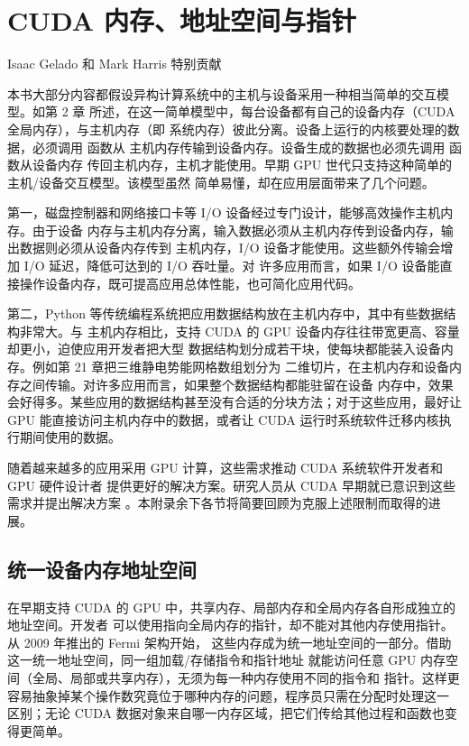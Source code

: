 \chapter{CUDA 内存、地址空间与指针}
\chaptercontents
\label{app:cuda-memories-address-spaces-pointers}

\begin{center}
  \small Isaac Gelado 和 Mark Harris 特别贡献
\end{center}

本书大部分内容都假设异构计算系统中的主机与设备采用一种相当简单的交互模型。如第 2 章
所述，在这一简单模型中，每台设备都有自己的设备内存（CUDA 全局内存），与主机内存（即
系统内存）彼此分离。设备上运行的内核要处理的数据，必须调用  函数从
主机内存传输到设备内存。设备生成的数据也必须先调用  函数从设备内存
传回主机内存，主机才能使用。早期 GPU 世代只支持这种简单的主机/设备交互模型。该模型虽然
简单易懂，却在应用层面带来了几个问题。

第一，磁盘控制器和网络接口卡等 I/O 设备经过专门设计，能够高效操作主机内存。由于设备
内存与主机内存分离，输入数据必须从主机内存传到设备内存，输出数据则必须从设备内存传到
主机内存，I/O 设备才能使用。这些额外传输会增加 I/O 延迟，降低可达到的 I/O 吞吐量。对
许多应用而言，如果 I/O 设备能直接操作设备内存，既可提高应用总体性能，也可简化应用代码。

第二，Python 等传统编程系统把应用数据结构放在主机内存中，其中有些数据结构非常大。与
主机内存相比，支持 CUDA 的 GPU 设备内存往往带宽更高、容量却更小，迫使应用开发者把大型
数据结构划分成若干块，使每块都能装入设备内存。例如第 21 章把三维静电势能网格数组划分为
二维切片，在主机内存和设备内存之间传输。对许多应用而言，如果整个数据结构都能驻留在设备
内存中，效果会好得多。某些应用的数据结构甚至没有合适的分块方法；对于这些应用，最好让
GPU 能直接访问主机内存中的数据，或者让 CUDA 运行时系统软件迁移内核执行期间使用的数据。

随着越来越多的应用采用 GPU 计算，这些需求推动 CUDA 系统软件开发者和 GPU 硬件设计者
提供更好的解决方案。研究人员从 CUDA 早期就已意识到这些需求并提出解决方案
\cite{appc-gelado}。本附录余下各节将简要回顾为克服上述限制而取得的进展。

\section{统一设备内存地址空间}
\label{sec:appc-unified-device-address-space}

在早期支持 CUDA 的 GPU 中，共享内存、局部内存和全局内存各自形成独立的地址空间。开发者
可以使用指向全局内存的指针，却不能对其他内存使用指针。从 2009 年推出的 Fermi 架构开始，
这些内存成为统一地址空间的一部分。借助这一统一地址空间，同一组加载/存储指令和指针地址
就能访问任意 GPU 内存空间（全局、局部或共享内存），无须为每一种内存使用不同的指令和
指针。这样更容易抽象掉某个操作数究竟位于哪种内存的问题，程序员只需在分配时处理这一
区别；无论 CUDA 数据对象来自哪一内存区域，把它们传给其他过程和函数也变得更简单。

